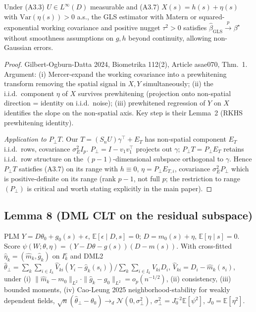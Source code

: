 \begin{lemma}\label{lem:god}
Under (A3.3) $U\in L^\infty(D)$ measurable and (A3.7) $X(s)=h(s)+\eta(s)$ with
$\mathrm{Var}(\eta(s))>0$ a.s., the GLS estimator with Matern or
squared-exponential working covariance and positive nugget $\tau^2>0$ satisfies
$\widehat\beta_{\mathrm{GLS}}\xrightarrow{p}\beta^\star$ without smoothness
assumptions on $g,h$ beyond continuity, allowing non-Gaussian errors.
\end{lemma}

\begin{proof}
Gilbert-Ogburn-Datta 2024, Biometrika 112(2), Article asae070, Thm.~1.
Argument: (i) Mercer-expand the working covariance into a prewhitening transform
removing the spatial signal in $X,Y$ simultaneously; (ii) the i.i.d.\ component
$\eta$ of $X$ survives prewhitening (projection onto non-spatial direction =
identity on i.i.d.\ noise); (iii) prewhitened regression of $Y$ on $X$
identifies the slope on the non-spatial axis. Key step is their Lemma~2
(RKHS prewhitening identity).

\emph{Application to $P_\perp T$.} Our $T=(S_nU)\gamma^\top+E_T$ has non-spatial
component $E_T$ i.i.d.\ rows, covariance $\sigma_E^2 I_p$. $P_\perp=I-v_1v_1^\top$
projects out $\gamma$; $P_\perp T=P_\perp E_T$ retains i.i.d.\ row structure on
the $(p-1)$-dimensional subspace orthogonal to $\gamma$. Hence $P_\perp T$
satisfies (A3.7) on its range with $h\equiv 0$, $\eta=P_\perp E_{T,i}$,
covariance $\sigma_E^2 P_\perp$ which is positive-definite on its range
(rank $p-1$, not full $p$; the restriction to range$(P_\perp)$ is critical and
worth stating explicitly in the main paper).
\end{proof}

\subsection*{Lemma 8 (DML CLT on the residual subspace)}

\begin{lemma}\label{lem:dml}
PLM $Y=D\theta_0+g_0(s)+\epsilon$, $\mathbb E[\epsilon\mid D,s]=0$;
$D=m_0(s)+\eta$, $\mathbb E[\eta\mid s]=0$. Score
$\psi(W;\theta,\eta)=(Y-D\theta-g(s))(D-m(s))$. With cross-fitted
$\widehat\eta_k=(\widehat m_k,\widehat g_k)$ on $I_k^c$ and DML2
$\widehat\theta_\perp=\sum_k\sum_{i\in I_k}\widehat V_{ki}(Y_i-\widehat g_k(s_i))/\sum_k\sum_{i\in I_k}\widehat V_{ki}D_i$,
$\widehat V_{ki}=D_i-\widehat m_k(s_i)$, under
(i) $\|\widehat m_k-m_0\|_{L^2}\cdot\|\widehat g_k-g_0\|_{L^2}=o_p(n^{-1/2})$,
(ii) consistency, (iii) bounded moments, (iv) Cao-Leung 2025
neighborhood-stability for weakly dependent fields,
$\sqrt n(\widehat\theta_\perp-\theta_0)\to_d\mathcal N(0,\sigma_\perp^2)$,
$\sigma_\perp^2=J_0^{-2}\mathbb E[\psi^2]$, $J_0=\mathbb E[\eta^2]$.
\end{lemma}


